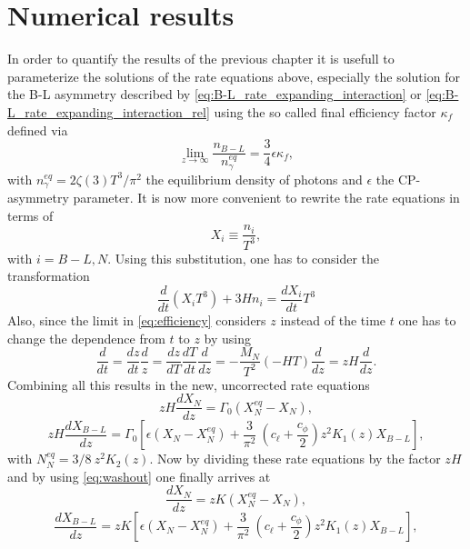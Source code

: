 \chapter{Numerical results} \label{sec:num_results}
In order to quantify the results of the previous chapter it is usefull to parameterize the solutions of the rate equations above, especially the solution for the B-L asymmetry described by \eqref{eq:B-L_rate_expanding_interaction} or \eqref{eq:B-L_rate_expanding_interaction_rel} using the so called final efficiency factor $\kappa_f$ defined via
\begin{equation}
\lim\limits_{z\rightarrow\infty}\frac{n_{B-L}}{n_\gamma^{eq}}=\frac{3}{4}\epsilon\kappa_f,
\label{eq:efficiency}
\end{equation}
with $n_\gamma^{eq}=2\zeta(3)T^3/\pi^2$ the equilibrium density of photons and $\epsilon$ the CP-asymmetry parameter. It is now more convenient to rewrite the rate equations in terms of
\begin{equation}
	X_i\equiv\frac{n_i}{T^3},
	\label{eq:X_i}
\end{equation}
 with $i=B-L,N$. Using this substitution, one has to consider the transformation \cite[Eq. 7.1]{Wormann:2016yyi}
\begin{equation}
\frac{d}{dt}(X_iT^3)+3Hn_i=\frac{dX_i}{dt}T^3
\end{equation}
Also, since the limit in \eqref{eq:efficiency} considers $z$ instead of the time $t$ one has to change the dependence from $t$ to $z$ by using
\begin{equation}
\frac{d}{dt}=\frac{dz}{dt}\frac{d}{z}=\frac{dz}{dT}\frac{dT}{dt}\frac{d}{dz}=-\frac{M_N}{T^2}(-HT)\frac{d}{dz}=zH\frac{d}{dz}.
\end{equation}
Combining all this results in the new, uncorrected rate equations
\begin{equation*}
zH\frac{dX_N}{dz}=\Gamma_0\left(X_N^{eq}-X_N\right),
\end{equation*}
\begin{equation*}
zH\frac{dX_{B-L}}{dz}=\Gamma_0\left[\epsilon\left(X_N-X_N^{eq}\right)+\frac{3}{\pi^2}\:\left(c_\ell+\frac{c_\phi}{2}\right)z^2K_1(z)X_{B-L}\right],
\end{equation*}
with $N_N^{eq}=3/8\:z^2K_2(z)$.
Now by dividing these rate equations by the factor $zH$ and by using \eqref{eq:washout} one finally arrives at
\begin{equation}
\frac{dX_N}{dz}=zK\left(X_N^{eq}-X_N\right),
\end{equation}
\begin{equation}
\frac{dX_{B-L}}{dz}=zK\left[\epsilon\left(X_N-X_N^{eq}\right)+\frac{3}{\pi^2}\:\left(c_\ell+\frac{c_\phi}{2}\right)z^2K_1(z)X_{B-L}\right],
\label{eq:X_B-L}
\end{equation}
